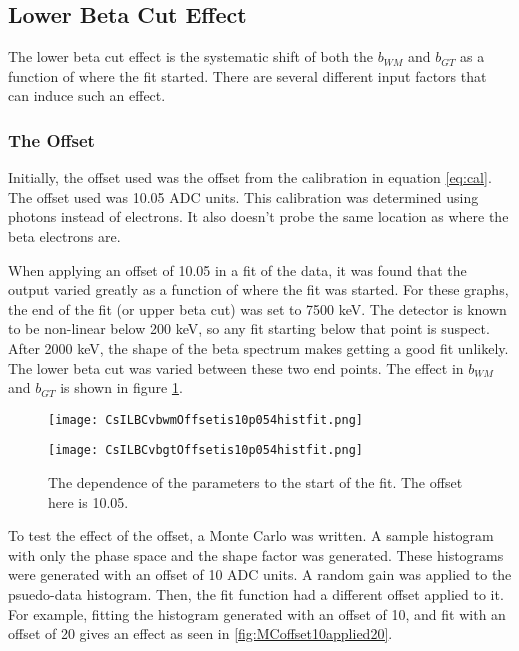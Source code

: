 \documentclass[../MaxHughesThesis.tex]{subfiles}
\begin{document}
\subsection{Lower Beta Cut Effect}

The lower beta cut effect is the systematic shift of both the $b_{WM}$ and $b_{GT}$ as a function of where the fit started.
There are several different input factors that can induce such an effect.

\subsubsection{The Offset}
Initially, the offset used was the offset from the calibration in equation \ref{eq:cal}.
The offset used was 10.05 ADC units.
This calibration was determined using photons instead of electrons.
It also doesn't probe the same location as where the beta electrons are.

When applying an offset of 10.05 in a fit of the data, it was found that the output varied greatly as a function of where the fit was started.
For these graphs, the end of the fit (or upper beta cut) was set to 7500 keV.
The detector is known to be non-linear below 200 keV, so any fit starting below that point is suspect. 
After 2000 keV, the shape of the beta spectrum makes getting a good fit unlikely.
The lower beta cut was varied between these two end points.
The effect in $b_{WM}$ and $b_{GT}$ is shown in figure \ref{fig:offset10LBCeffect}.

\begin{figure}
    \centering
    \begin{minipage}{0.50\textwidth}
        \centerline{\texttt{[image: CsILBCvbwmOffsetis10p054histfit.png]}}
    \end{minipage}\hfill
    \begin{minipage}{0.50\textwidth}
        \centerline{\texttt{[image: CsILBCvbgtOffsetis10p054histfit.png]}}
    \end{minipage}
    \caption{The dependence of the parameters to the start of the fit.
	     The offset here is 10.05.}
    \label{fig:offset10LBCeffect}
\end{figure}

To test the effect of the offset, a Monte Carlo was written.
A sample histogram with only the phase space and the shape factor was generated. 
These histograms were generated with an offset of 10 ADC units.
A random gain was applied to the psuedo-data histogram. 
Then, the fit function had a different offset applied to it.
For example, fitting the histogram generated with an offset of 10, and fit with an offset of 20 gives an effect as seen in \ref{fig:MCoffset10applied20}.
\end{document}
